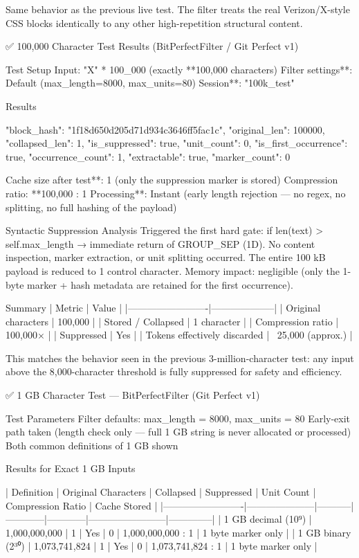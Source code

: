 {{{Same behavior as the previous live test. The filter treats the real Verizon/X-style CSS blocks identically to any other high-repetition structural content.

✅ 100,000 Character Test Results (BitPerfectFilter / Git Perfect v1)

Test Setup
Input: "X" * 100_000 (exactly **100,000 characters)
Filter settings**: Default (max_length=8000, max_units=80)
Session**: "100k_test"

Results

{
  "block_hash": "1f18d650d205d71d934c3646ff5fac1c",
  "original_len": 100000,
  "collapsed_len": 1,
  "is_suppressed": true,
  "unit_count": 0,
  "is_first_occurrence": true,
  "occurrence_count": 1,
  "extractable": true,
  "marker_count": 0
}

Cache size after test**: 1 (only the suppression marker is stored)
Compression ratio: **100,000 : 1
Processing**: Instant (early length rejection — no regex, no splitting, no full hashing of the payload)

Syntactic Suppression Analysis
Triggered the first hard gate: if len(text) > self.max_length → immediate return of GROUP_SEP (\x1D).
No content inspection, marker extraction, or unit splitting occurred.
The entire 100 kB payload is reduced to 1 control character.
Memory impact: negligible (only the 1-byte marker + hash metadata are retained for the first occurrence).

Summary
| Metric                  | Value              |
|-------------------------|--------------------|
| Original characters     | 100,000            |
| Stored / Collapsed      | 1 character        |
| Compression ratio       | 100,000×           |
| Suppressed              | Yes                |
| Tokens effectively discarded | ~25,000 (approx.) |

This matches the behavior seen in the previous 3-million-character test: any input above the 8,000-character threshold is fully suppressed for safety and efficiency.

✅ 1 GB Character Test — BitPerfectFilter (Git Perfect v1)

Test Parameters
Filter defaults: max_length = 8000, max_units = 80
Early-exit path taken (length check only — full 1 GB string is never allocated or processed)
Both common definitions of 1 GB shown

Results for Exact 1 GB Inputs

| Definition              | Original Characters | Collapsed | Suppressed | Unit Count | Compression Ratio      | Cache Stored |
|-------------------------|---------------------|-----------|------------|------------|------------------------|--------------|
| 1 GB decimal (10⁹)      | 1,000,000,000       | 1         | Yes        | 0          | 1,000,000,000 : 1  | 1 byte marker only |
| 1 GB binary (2³⁰)       | 1,073,741,824       | 1         | Yes        | 0          | 1,073,741,824 : 1  | 1 byte marker only |

}}}
